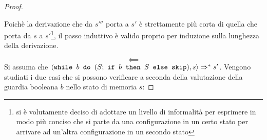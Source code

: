 \begin{proof}
\begin{itemize}
\begin{itemize}
      Poichè la derivazione che da $s'''$ porta a $s'$ è strettamente più
      corta di quella che porta da $s$ a $s'$\footnote{si è volutamente deciso
      di adottare un livello di informalità per esprimere in modo più
      conciso che si parte da una configurazione in un certo stato per
      arrivare ad un'altra configurazione in un secondo stato}, il passo
      induttivo è valido proprio per induzione sulla lunghezza della
      derivazione.
  \end{itemize}
\end{itemize}


$$
\boxed{\impliedby}
$$
Si assuma che
$\confSs{\wbS{b}{(S;\ \ifABC{b}{S}{\skipForFriends})}}{s} \Rar{*} s'$. Vengono
studiati i due casi che si possono verificare a seconda della valutazione
della guardia booleana $b$ nello stato di memoria $s$:


\end{proof}
